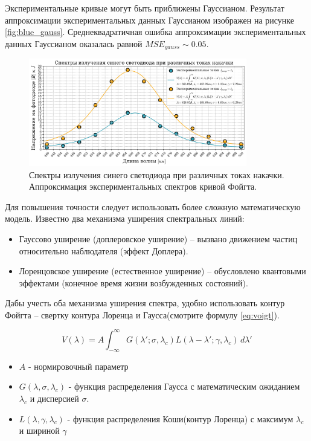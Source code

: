 \documentclass[a4paper, 12pt]{extarticle}
\begin{document}
Экспериментальные кривые могут быть приближены Гауссианом. Результат аппроксимации экспериментальных данных  Гауссианом изображен на рисунке \ref{fig:blue_gauss}. Среднеквадратичная ошибка аппроксимации экспериментальных данных Гауссианом оказалась равной $MSE_{gauss} \sim 0.05$. 


\begin{figure}[htbp]
    \centering
    \includegraphics[width = 0.85\textwidth]{blue.png}
    \caption{Спектры излучения синего светодиода при различных токах накачки. Аппроксимация экспериментальных спектров кривой Фойгта.}
    \label{fig:blue}
\end{figure}


Для повышения точности следует использовать более сложную математическую модель. Известно два механизма уширения спектральных линий:
\begin{itemize}
    \item Гауссово уширение (доплеровское уширение) – вызвано движением частиц относительно наблюдателя (эффект Доплера). 
    \item Лоренцовское уширение (естественное уширение) – обусловлено квантовыми эффектами (конечное время жизни возбужденных состояний).
\end{itemize}

Дабы учесть оба механизма уширения спектра, удобно использовать контур Фойгта -- свертку контура Лоренца и Гаусса(смотрите формулу \ref{eq:voigt}).

\begin{equation}
    V(\lambda) = A \int_{-\infty}^{\infty} G(\lambda'; \sigma, \lambda_c) L(\lambda - \lambda'; \gamma, \lambda_c) \, d\lambda'
    \label{eq:voigt}
\end{equation}
\begin{itemize}
    \item $A$ - нормировочный параметр
    \item $G(\lambda, \sigma, \lambda_c)$ - функция распределения Гаусса с математическим ожиданием $\lambda_c$ и дисперсией $\sigma$.
    \item $L(\lambda, \gamma, \lambda_c)$ - функция распределения Коши(контур Лоренца) с максимум $\lambda_c$ и шириной $\gamma$
\end{itemize}
\end{document}

